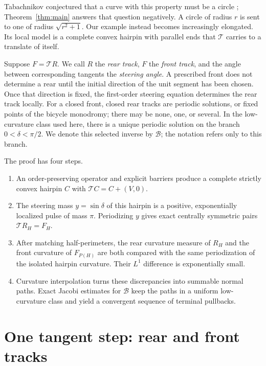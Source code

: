\documentclass[11pt]{article}
\theoremstyle{remark}
\newcommand{\Tmap}{\mathcal T}
\newcommand{\Bmap}{\mathcal B}
\begin{document}
Tabachnikov conjectured that a curve with this property must be a circle
\cite[Conjecture~4]{Tabachnikov2023}; Theorem~\ref{thm:main} answers that
question negatively.  A circle of radius \(r\) is sent to one of radius
\(\sqrt{r^2+1}\).  Our example instead becomes increasingly elongated.  Its
local model is a complete convex hairpin with parallel ends that \(\Tmap\)
carries to a translate of itself.

Suppose \(F=\Tmap R\).  We call \(R\) the \emph{rear track}, \(F\) the
\emph{front track}, and the angle between corresponding tangents the
\emph{steering angle}.  A prescribed front does not determine a rear until the
initial direction of the unit segment has been chosen.  Once that direction is
fixed, the first-order steering equation determines the rear track locally.
For a closed front, closed rear tracks are periodic solutions, or fixed points
of the bicycle monodromy; there may be none, one, or several.  In the
low-curvature class used here, there is a unique periodic solution on the
branch \(0<\delta<\pi/2\).  We denote this selected inverse by \(\Bmap\); the
notation refers only to this branch.

The proof has four steps.

\begin{enumerate}[label=\arabic*.,leftmargin=*]
\item An order-preserving operator and explicit barriers produce a complete
      strictly convex hairpin \(C\) with \(\Tmap C=C+(V,0)\).
\item The steering mass \(y=\sin\delta\) of this hairpin is a positive,
      exponentially localized pulse of mass \(\pi\).  Periodizing \(y\)
      gives exact centrally symmetric pairs \(\Tmap R_H=F_H\).
\item After matching half-perimeters, the rear curvature measure of \(R_H\)
      and the front curvature of \(F_{P(H)}\) are both compared with the same
      periodization of the isolated hairpin curvature.  Their \(L^1\)
      difference is exponentially small.
\item Curvature interpolation turns these discrepancies into summable normal
      paths.  Exact Jacobi estimates for \(\Bmap\) keep the paths in a uniform
      low-curvature class and yield a convergent sequence of terminal
      pullbacks.
\end{enumerate}

\section{One tangent step: rear and front tracks}\label{sec:bicycle}
\end{document}
